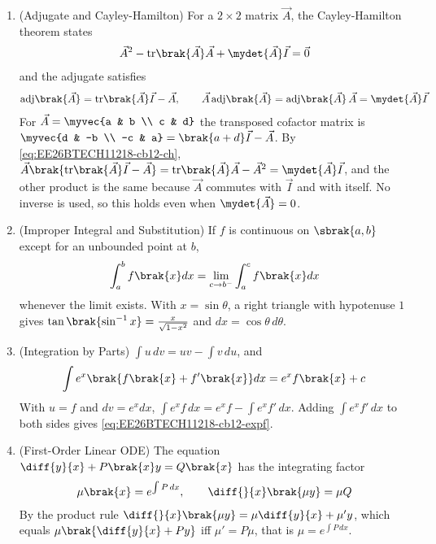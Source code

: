 \begin{enumerate}[label=\thesubsection.\arabic*, ref=\thesubsection.\theenumi,itemsep=1.5em]
\item (Adjugate and Cayley-Hamilton) For a $2\times2$ matrix $\vec{A}$, the Cayley-Hamilton theorem states
\begin{align}
\vec{A}^2-\mathrm{tr}\brak{\vec{A}}\vec{A}+\mydet{\vec{A}}\vec{I}=\vec{0}
\label{eq:EE26BTECH11218-cb12-ch}
\end{align}
and the adjugate satisfies
\begin{align}
\mathrm{adj}\brak{\vec{A}} = \mathrm{tr}\brak{\vec{A}}\vec{I}-\vec{A}, \qquad \vec{A}\,\mathrm{adj}\brak{\vec{A}} = \mathrm{adj}\brak{\vec{A}}\,\vec{A} = \mydet{\vec{A}}\vec{I}
\label{eq:EE26BTECH11218-cb12-adj}
\end{align}
\solution For $\vec{A}=\myvec{a & b \\ c & d}$ the transposed cofactor matrix is $\myvec{d & -b \\ -c & a} = \brak{a+d}\vec{I}-\vec{A}$. By \eqref{eq:EE26BTECH11218-cb12-ch}, $\vec{A}\brak{\mathrm{tr}\brak{\vec{A}}\vec{I}-\vec{A}} = \mathrm{tr}\brak{\vec{A}}\vec{A}-\vec{A}^2 = \mydet{\vec{A}}\vec{I}$, and the other product is the same because $\vec{A}$ commutes with $\vec{I}$ and with itself. No inverse is used, so this holds even when $\mydet{\vec{A}}=0$.

\item (Improper Integral and Substitution) If $f$ is continuous on $\sbrak{a,b}$ except for an unbounded point at $b$,
\begin{align}
\int_a^bf\brak{x}dx = \lim_{c\to b^{-}}\int_a^cf\brak{x}dx
\label{eq:EE26BTECH11218-cb12-improper}
\end{align}
whenever the limit exists. With $x=\sin\theta$, a right triangle with hypotenuse $1$ gives $\tan\brak{\sin^{-1}x}=\frac{x}{\sqrt{1-x^2}}$ and $dx=\cos\theta\,d\theta$.

\item (Integration by Parts) $\int u\,dv = uv-\int v\,du$, and
\begin{align}
\int e^x\brak{f\brak{x}+f'\brak{x}}dx = e^xf\brak{x}+c
\label{eq:EE26BTECH11218-cb12-expf}
\end{align}
\solution With $u=f$ and $dv=e^xdx$, $\int e^xf\,dx = e^xf-\int e^xf'\,dx$. Adding $\int e^xf'\,dx$ to both sides gives \eqref{eq:EE26BTECH11218-cb12-expf}.

\item (First-Order Linear ODE) The equation $\diff{y}{x}+P\brak{x}y=Q\brak{x}$ has the integrating factor
\begin{align}
\mu\brak{x} = e^{\int P\,dx}, \qquad \diff{}{x}\brak{\mu y} = \mu Q
\label{eq:EE26BTECH11218-cb12-linode}
\end{align}
\solution By the product rule $\diff{}{x}\brak{\mu y} = \mu\diff{y}{x}+\mu'y$, which equals $\mu\brak{\diff{y}{x}+Py}$ iff $\mu'=P\mu$, that is $\mu=e^{\int P\,dx}$.


\end{enumerate}
